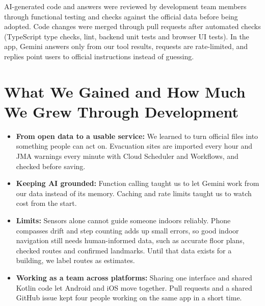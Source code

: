 \documentclass[11pt,a4paper]{article}
\begin{document}
AI-generated code and answers were reviewed by development team members through functional
testing and checks against the official data before being adopted. Code changes were merged
through pull requests after automated checks (TypeScript type checks, lint, backend unit tests
and browser UI tests). In the app, Gemini answers only from our tool results, requests are
rate-limited, and replies point users to official instructions instead of guessing.

\section{What We Gained and How Much We Grew Through Development}

\begin{itemize}[leftmargin=1.4em,itemsep=3pt,topsep=4pt]
  \item \textbf{From open data to a usable service:} We learned to turn official files into
        something people can act on. Evacuation sites are imported every hour and JMA
        warnings every minute with Cloud Scheduler and Workflows, and checked before saving.
  \item \textbf{Keeping AI grounded:} Function calling taught us to let Gemini work from our
        data instead of its memory. Caching and rate limits taught us to watch cost from the start.
  \item \textbf{Limits:} Sensors alone cannot guide someone indoors reliably. Phone compasses
        drift and step counting adds up small errors, so good indoor navigation still needs
        human-informed data, such as accurate floor plans, checked routes and confirmed
        landmarks. Until that data exists for a building, we label routes as estimates.
  \item \textbf{Working as a team across platforms:} Sharing one interface and shared Kotlin
        code let Android and iOS move together. Pull requests and a shared GitHub issue kept
        four people working on the same app in a short time.
\end{itemize}
\end{document}
